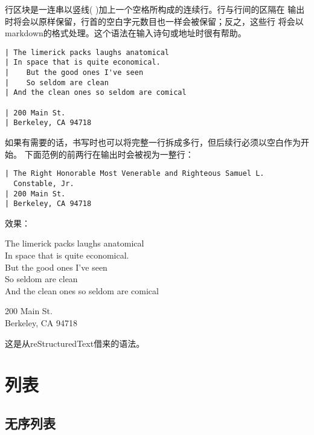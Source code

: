 \documentclass[fancyhdr,bookmark]{ctexbook}
\begin{document}
行区块是一连串以竖线(
\textbar)加上一个空格所构成的连续行。行与行间的区隔在
输出时将会以原样保留，行首的空白字元数目也一样会被保留；反之，这些行
将会以markdown的格式处理。这个语法在输入诗句或地址时很有帮助。

\begin{lstlisting}
| The limerick packs laughs anatomical
| In space that is quite economical.
|    But the good ones I've seen
|    So seldom are clean
| And the clean ones so seldom are comical

| 200 Main St.
| Berkeley, CA 94718
\end{lstlisting}

如果有需要的话，书写时也可以将完整一行拆成多行，但后续行必须以空白作为开始。
下面范例的前两行在输出时会被视为一整行：

\begin{lstlisting}
| The Right Honorable Most Venerable and Righteous Samuel L.
  Constable, Jr.
| 200 Main St.
| Berkeley, CA 94718
\end{lstlisting}

效果：

The limerick packs laughs anatomical\\
In space that is quite economical.\\
\hspace*{0.333em}\hspace*{0.333em}\hspace*{0.333em}But the good ones
I've seen\\
\hspace*{0.333em}\hspace*{0.333em}\hspace*{0.333em}So seldom are clean\\
And the clean ones so seldom are comical

200 Main St.\\
Berkeley, CA 94718

这是从reStructuredText借来的语法。

\hypertarget{ux5217ux8868}{%
\section{列表}\label{ux5217ux8868}}

\hypertarget{ux65e0ux5e8fux5217ux8868}{%
\subsection{无序列表}\label{ux65e0ux5e8fux5217ux8868}}
\end{document}
